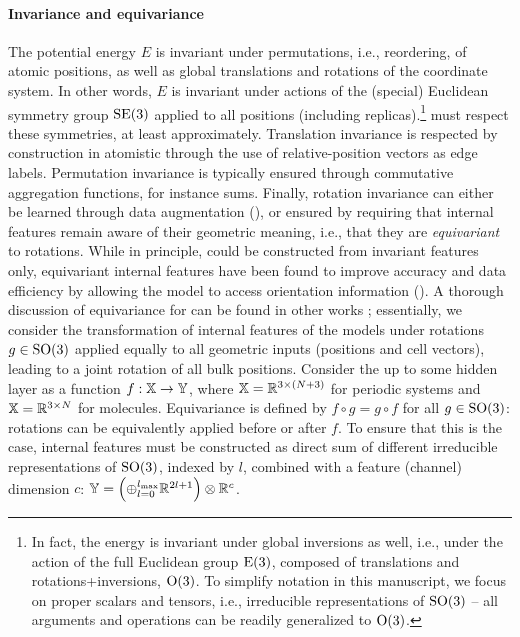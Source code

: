 \documentclass[10pt]{article} %
\begin{document}
\paragraph{Invariance and equivariance}
The potential energy $E$ is invariant under
permutations, i.e., reordering, of atomic positions,
as well as global translations and rotations of the coordinate system.
In other words, $E$ is invariant under actions of the (special) Euclidean symmetry group $\text{SE}(3)$ applied to all positions (including replicas).\footnote{In fact, the energy is invariant under global inversions as well, i.e., under the action of the full Euclidean group $\text{E}(3)$, composed of translations and rotations+inversions, $\text{O}(3)$. To simplify notation in this manuscript, we focus on proper scalars and tensors, i.e., irreducible representations of $\text{SO}(3)$ -- all arguments and operations can be readily generalized to $\text{O}(3)$.}
\mlps must respect these symmetries, at least approximately.
Translation invariance is respected by construction in atomistic \gnns{} through the use of relative-position vectors as edge labels.
Permutation invariance is typically ensured through commutative aggregation functions, for instance sums.
Finally, rotation invariance can either be learned through data augmentation (\cite{pc2023,lpc2024}), or ensured by requiring that internal features remain aware of their geometric meaning, i.e., that they are \emph{equivariant} to rotations.
While in principle, \mlps could be constructed from invariant features only, equivariant internal features have been found to improve accuracy and data efficiency by allowing the model to access orientation information (\cite{tskylkr2018,bmsgmkmsk2022,bksoc2022}).
A thorough discussion of equivariance for \mlps can be found in other works \citep{s2021,um2024};
essentially, we consider the transformation of internal features of the models under rotations $g \in \text{SO}(3)$ applied equally to all geometric inputs (positions and cell vectors), leading to a joint rotation of all bulk positions.
Consider the \mlp up to some hidden layer as a function $f: {\mathbb{X}} \rightarrow {\mathbb{Y}}$, where $ {\mathbb{X}} = {\mathbb{R}^{3 \times (N+3)}}$ for periodic systems and ${\mathbb{X}} = {\mathbb{R}^{3\times N}}$ for molecules.
Equivariance is defined by $f \circ g = g \circ f$ for all $g \in \text{SO}(3)$: rotations can be equivalently applied before or after $f$.
To ensure that this is the case, internal features must be constructed as direct sum of different irreducible representations of $\text{SO}(3)$, indexed by $l$, combined with a feature (channel) dimension $c$: ${\mathbb{Y}} = \left( \oplus_{l=0}^{l_{\text{max}}} \mathbb{R}^{2l+1} \right) \otimes \mathbb{R}^c$.
\end{document}
